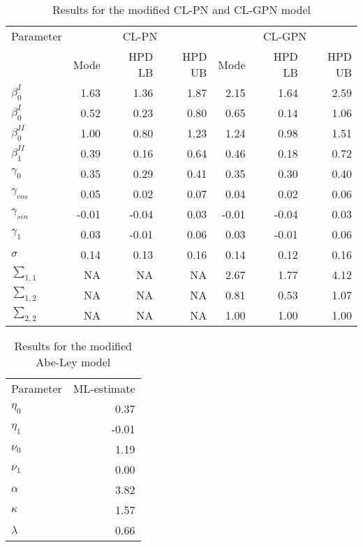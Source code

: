 \documentclass[11pt,]{article}
\begin{document}
\begin{table}

\caption{\label{tab:estCLGPN}Results for the modified CL-PN and CL-GPN model}
\centering
\begin{tabular}[t]{lrrrrrr}
\toprule
\multicolumn{1}{c}{Parameter} & \multicolumn{3}{c}{CL-PN} & \multicolumn{3}{c}{CL-GPN} \\
\cmidrule(l{2pt}r{2pt}){1-1} \cmidrule(l{2pt}r{2pt}){2-4} \cmidrule(l{2pt}r{2pt}){5-7}
  & Mode & HPD LB & HPD UB & Mode & HPD LB & HPD UB\\
\midrule
$\beta_0^{I}$ & 1.63 & 1.36 & 1.87 & 2.15 & 1.64 & 2.59\\
$\beta_0^{I}$ & 0.52 & 0.23 & 0.80 & 0.65 & 0.14 & 1.06\\
$\beta_0^{II}$ & 1.00 & 0.80 & 1.23 & 1.24 & 0.98 & 1.51\\
$\beta_1^{II}$ & 0.39 & 0.16 & 0.64 & 0.46 & 0.18 & 0.72\\
$\gamma_0$ & 0.35 & 0.29 & 0.41 & 0.35 & 0.30 & 0.40\\
\addlinespace
$\gamma_{cos}$ & 0.05 & 0.02 & 0.07 & 0.04 & 0.02 & 0.06\\
$\gamma_{sin}$ & -0.01 & -0.04 & 0.03 & -0.01 & -0.04 & 0.03\\
$\gamma_1$ & 0.03 & -0.01 & 0.06 & 0.03 & -0.01 & 0.06\\
$\sigma$ & 0.14 & 0.13 & 0.16 & 0.14 & 0.12 & 0.16\\
$\sum_{1,1}$ & NA & NA & NA & 2.67 & 1.77 & 4.12\\
\addlinespace
$\sum_{1,2}$ & NA & NA & NA & 0.81 & 0.53 & 1.07\\
$\sum_{2,2}$ & NA & NA & NA & 1.00 & 1.00 & 1.00\\
\bottomrule
\end{tabular}
\end{table}

\begin{table}

\caption{\label{tab:estSL}Results for the modified Abe-Ley model}
\centering
\begin{tabular}[t]{lr}
\toprule
\multicolumn{1}{c}{Parameter} & \multicolumn{1}{c}{ML-estimate} \\
\cmidrule(l{2pt}r{2pt}){1-1} \cmidrule(l{2pt}r{2pt}){2-2}
$\eta_0$ & 0.37\\
$\eta_1$ & -0.01\\
$\nu_0$ & 1.19\\
$\nu_1$ & 0.00\\
$\alpha$ & 3.82\\
\addlinespace
$\kappa$ & 1.57\\
$\lambda$ & 0.66\\
\bottomrule
\end{tabular}
\end{table}
\end{document}
